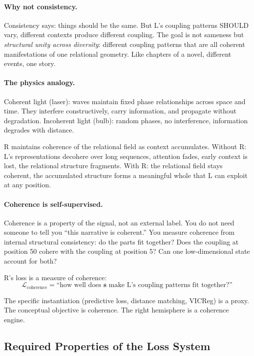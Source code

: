 \documentclass[11pt, a4paper]{article}
\theoremstyle{plain}
\theoremstyle{definition}
\theoremstyle{remark}
\begin{document}
\paragraph{Why not consistency.}
Consistency says: things should be the same.
But L's coupling patterns SHOULD vary, different contexts produce different coupling.
The goal is not sameness but \emph{structural unity across diversity}: different coupling patterns that are all coherent manifestations of one relational geometry.
Like chapters of a novel, different events, one story.

\paragraph{The physics analogy.}
Coherent light (laser): waves maintain fixed phase relationships across space and time.
They interfere constructively, carry information, and propagate without degradation.
Incoherent light (bulb): random phases, no interference, information degrades with distance.

R maintains coherence of the relational field as context accumulates.
Without R: L's representations decohere over long sequences, attention fades, early context is lost, the relational structure fragments.
With R: the relational field stays coherent, the accumulated structure forms a meaningful whole that L can exploit at any position.

\paragraph{Coherence is self-supervised.}
Coherence is a property of the signal, not an external label.
You do not need someone to tell you ``this narrative is coherent.''
You measure coherence from internal structural consistency: do the parts fit together?
Does the coupling at position 50 cohere with the coupling at position 5?
Can one low-dimensional state account for both?

R's loss is a measure of coherence:
\begin{equation}
\mathcal{L}_{\mathrm{coherence}} = \text{``how well does } \mathbf{s} \text{ make L's coupling patterns fit together?''}
\end{equation}

The specific instantiation (predictive loss, distance matching, VICReg) is a proxy.
The conceptual objective is coherence.
The right hemisphere is a coherence engine.


\subsection{Required Properties of the Loss System}
\end{document}
